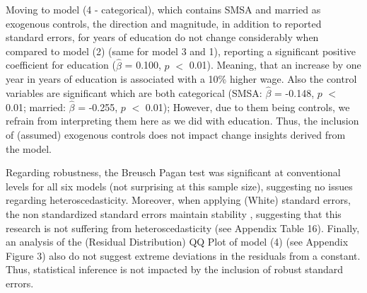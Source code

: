 \documentclass[a4paper]{article}
\begin{document}
Moving to model (4 - categorical), which contains SMSA and married as exogenous controls, the direction and magnitude, in addition to reported standard errors, for years of education do not change considerably when compared to model (2) (same for model 3 and 1), reporting a significant positive coefficient for education ($\hat{\beta}$ = 0.100, $p$ $<$ 0.01). Meaning, that an increase by one year in years of education is associated with a 10\% higher wage. Also the control variables are significant which are both categorical (SMSA: $\hat{\beta}$ = -0.148, $p$ $<$ 0.01; married: $\hat{\beta}$ = -0.255, $p$ $<$ 0.01); However, due to them being controls, we refrain from interpreting them here as we did with education. Thus, the inclusion of (assumed) exogenous controls does not impact change insights derived from the model.

Regarding robustness, the Breusch Pagan test was significant at conventional levels for all six models (not surprising at this sample size), suggesting no issues regarding heteroscedasticity. Moreover, when applying (White) standard errors, the non standardized standard errors maintain stability , suggesting that this research is not suffering from heteroscedasticity (see Appendix Table 16). Finally, an analysis of the (Residual Distribution) QQ Plot of model (4) (see Appendix Figure 3) also do not suggest extreme deviations in the residuals from a constant. Thus, statistical inference is not impacted by the inclusion of robust standard errors. 
\end{document}
